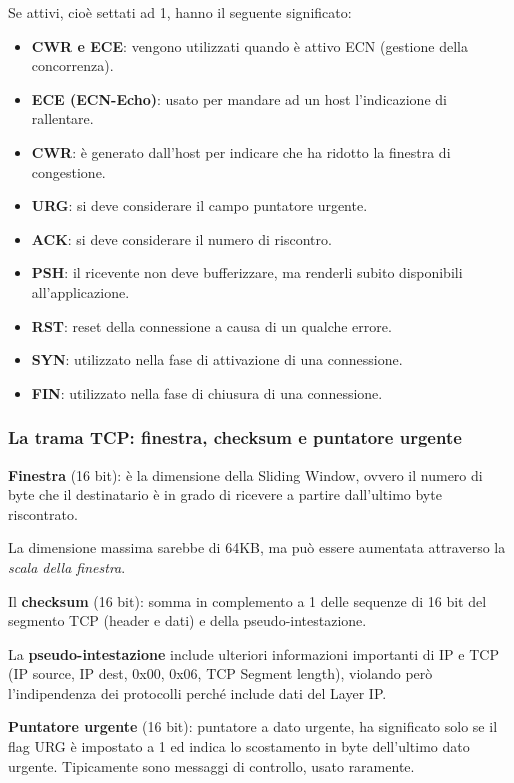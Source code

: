             Se attivi, cioè settati ad 1, hanno il seguente significato:
            \begin{itemize}
                \item \textbf{CWR e ECE}: vengono utilizzati quando è attivo ECN (gestione della concorrenza).
                \item \textbf{ECE (ECN-Echo)}: usato per mandare ad un host l'indicazione di rallentare.
                \item \textbf{CWR}: è generato dall'host per indicare che ha ridotto la finestra di congestione.
                \item \textbf{URG}: si deve considerare il campo puntatore urgente.
                \item \textbf{ACK}: si deve considerare il numero di riscontro.
                \item \textbf{PSH}: il ricevente non deve bufferizzare, ma renderli subito disponibili all'applicazione.
                \item \textbf{RST}: reset della connessione a causa di un qualche errore.
                \item \textbf{SYN}: utilizzato nella fase di attivazione di una connessione.
                \item \textbf{FIN}: utilizzato nella fase di chiusura di una connessione.
            \end{itemize}

        \subsubsection{La trama TCP: finestra, checksum e puntatore urgente}
            \textbf{Finestra} (16 bit): è la dimensione della Sliding Window, ovvero il numero di byte che il destinatario è in grado di ricevere a partire dall'ultimo byte riscontrato.
        
            La dimensione massima sarebbe di 64KB, ma può essere aumentata attraverso la \textit{scala della finestra}.

            Il \textbf{checksum} (16 bit): somma in complemento a 1 delle sequenze di 16 bit del segmento TCP (header e dati) e della pseudo-intestazione.

            La \textbf{pseudo-intestazione} include ulteriori informazioni importanti di IP e TCP (IP source, IP dest, 0x00, 0x06, TCP Segment length), violando però l'indipendenza dei protocolli perché include dati del Layer IP.

            \textbf{Puntatore urgente} (16 bit): puntatore a dato urgente, ha significato solo se il flag URG è impostato a 1 ed indica lo scostamento in byte dell'ultimo dato urgente. Tipicamente sono messaggi di controllo, usato raramente.

